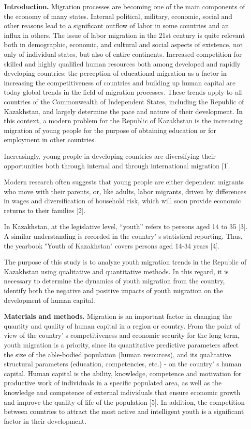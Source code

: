 {{\bfseries Introduction.} Migration processes are becoming one of the main
components of the economy of many states. Internal political, military,
economic, social and other reasons lead to a significant outflow of
labor in some countries and an influx in others. The issue of labor
migration in the 21st century is quite relevant both in demographic,
economic, and cultural and social aspects of existence, not only of
individual states, but also of entire continents. Increased competition
for skilled and highly qualified human resources both among developed
and rapidly developing countries; the perception of educational
migration as a factor in increasing the competitiveness of countries and
building up human capital are today global trends in the field of
migration processes. These trends apply to all countries of the
Commonwealth of Independent States, including the Republic of
Kazakhstan, and largely determine the pace and nature of their
development. In this context, a modern problem for the Republic of
Kazakhstan is the increasing migration of young people for the purpose
of obtaining education or for employment in other countries.

Increasingly, young people in developing countries are diversifying
their opportunities both through internal and through international
migration {[}1{]}.

Modern research often suggests that young people are either dependent
migrants who move with their parents, or, like adults, labor migrants,
driven by differences in wages and diversification of household risk,
which will soon provide economic returns to their families {[}2{]}.

In Kazakhstan, at the legislative level, ``youth'' refers to persons
aged 14 to 35 {[}3{]}. A similar understanding is recorded in the
country' s statistical reporting. Thus, the yearbook
"Youth of Kazakhstan" covers persons aged 14-34 years {[}4{]}.

The purpose of this study is to analyze youth migration trends in the
Republic of Kazakhstan using qualitative and quantitative methods. In
this regard, it is necessary to determine the dynamics of youth
migration from the country, identify both the negative and positive
impacts of youth migration on the development of human capital.

{\bfseries Materials and methods.} Migration is an important factor in
changing the quantity and quality of human capital in a region or
country. From the point of view of the country' s
competitiveness and economic security for the long term, youth migration
is a priority, since its quantitative predictive parameters affect the
size of the able-bodied population (human resources), and its
qualitative structural parameters (education, competencies, etc.) - on
the country' s human capital. Human capital is the
ability, knowledge, competence and motivation for productive work of
individuals in a specific populated area, as well as the knowledge and
competence of external individuals that ensure economic growth and
improve the quality of life of the population {[}5{]}. In addition, the
competition between countries to attract the most active and intelligent
youth is a significant factor in their development.

}
